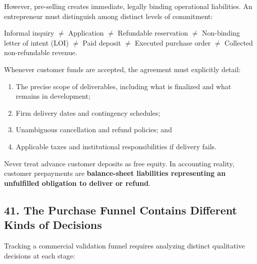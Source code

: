 However, pre-selling creates immediate, legally binding operational liabilities. An entrepreneur must distinguish among distinct levels of commitment:
\begin{center}
Informal inquiry $\neq$ Application $\neq$ Refundable reservation $\neq$ Non-binding letter of intent (LOI) $\neq$ Paid deposit $\neq$ Executed purchase order $\neq$ Collected non-refundable revenue.
\end{center}

Whenever customer funds are accepted, the agreement must explicitly detail:
\begin{enumerate}
    \item The precise scope of deliverables, including what is finalized and what remains in development;
    \item Firm delivery dates and contingency schedules;
    \item Unambiguous cancellation and refund policies; and
    \item Applicable taxes and institutional responsibilities if delivery fails.
\end{enumerate}

Never treat advance customer deposits as free equity. In accounting reality, customer prepayments are \textbf{balance-sheet liabilities representing an unfulfilled obligation to deliver or refund}.

\subsection*{41. The Purchase Funnel Contains Different Kinds of Decisions}

Tracking a commercial validation funnel requires analyzing distinct qualitative decisions at each stage:

